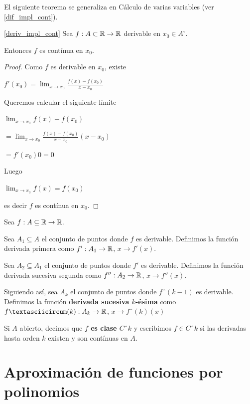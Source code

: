 
El siguiente teorema se generaliza en Cálculo de varias variables (ver \ref{dif_impl_cont}).

\begin{theorem} \ref{deriv_impl_cont}
Sea $ f : A \subset \mathbb{R} \to \mathbb{R}$ derivable en $ x_0 \in A^{\circ}$.

Entonces $f$ es contínua en $x_0$.
\end{theorem}

\begin{proof}
Como $f$ es derivable en $x_0$, existe

$f'(x_0) = \lim_{x \to x_0} \frac{f(x) - f(x_0)}{x - x_0}$

Queremos calcular el siguiente límite

$ \lim_{x \to x_0} f(x) - f(x_0)$

$ = \lim_{x \to x_0} \frac{f(x) - f(x_0)}{x - x_0} (x - x_0)$

$ = f'(x_0) 0 = 0$

Luego

$ \lim_{x \to x_0} f(x) = f(x_0)$

es decir $f$ es contínua en $x_0$.
\end{proof}

\begin{definition}[Sucesivas]
Sea $f:A \subseteq \mathbb{R} \to \mathbb{R}$.

Sea $A_1 \subseteq A$ el conjunto de puntos donde $f$ es derivable.  Definimos la función derivada primera como $f' : A_1 \to \mathbb{R}$, $x \to f'(x)$.

Sea $A_2 \subseteq A_1$ el conjunto de puntos donde $f'$ es derivable.  Definimos la función derivada sucesiva segunda como $f'' : A_2 \to \mathbb{R}$, $x \to f''(x)$.

Siguiendo así, sea $A_k$ el conjunto de puntos donde $fˆ{(k-1)}$ es derivable.  Definimos la función \textbf{derivada sucesiva $k$-ésima} como $fˆ{(k)} : A_k \to \RR$, $x \to fˆ{(k)}(x)$

Si $A$ abierto, decimos que \textbf{$f$ es clase $Cˆk$} y escribimos $f \in Cˆk$ si las derivadas hasta orden $k$ existen y son contínuas en $A$.
\end{definition}




\chapter{Aproximación de funciones por polinomios}

